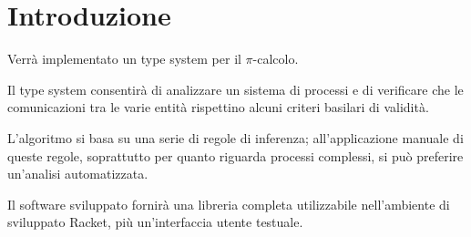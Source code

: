 \section{Introduzione}

Verr\`a implementato un type system per il $\pi$-calcolo.

Il type system consentir\`a di analizzare un sistema di processi e di
verificare che le comunicazioni tra le varie entit\`a rispettino alcuni
criteri basilari di validit\`a.

L'algoritmo si basa su una serie di regole di inferenza; all'applicazione
manuale di queste regole, soprattutto per quanto riguarda processi
complessi, si pu\`o preferire un'analisi automatizzata.

Il software sviluppato fornir\`a una libreria completa utilizzabile
nell'ambiente di sviluppato Racket, pi\`u un'interfaccia utente testuale.






